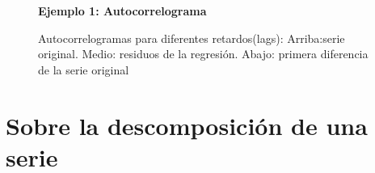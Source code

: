 \begin{figure}[H]
	\centering
	\textbf{Ejemplo 1: Autocorrelograma}\par\medskip
	\caption{Autocorrelogramas para diferentes retardos(lags): Arriba:serie original. Medio: residuos de la regresión. Abajo: primera diferencia de la serie original}\label{fig4}
\end{figure}

\pagebreak\section{Sobre la descomposici\'on de una serie}

